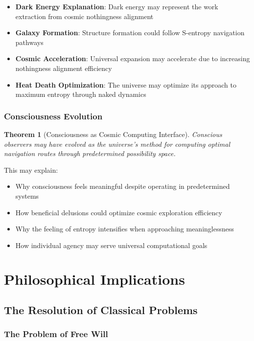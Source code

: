 \documentclass[11pt,a4paper]{article}
\newtheorem{theorem}{Theorem}[section]
\theoremstyle{remark}
\begin{document}
\begin{itemize}
\item \textbf{Dark Energy Explanation}: Dark energy may represent the work extraction from cosmic nothingness alignment
\item \textbf{Galaxy Formation}: Structure formation could follow S-entropy navigation pathways
\item \textbf{Cosmic Acceleration}: Universal expansion may accelerate due to increasing nothingness alignment efficiency
\item \textbf{Heat Death Optimization}: The universe may optimize its approach to maximum entropy through naked dynamics
\end{itemize}

\subsubsection{Consciousness Evolution}

\begin{theorem}[Consciousness as Cosmic Computing Interface]
Conscious observers may have evolved as the universe's method for computing optimal navigation routes through predetermined possibility space.
\end{theorem}

This may explain:
\begin{itemize}
\item Why consciousness feels meaningful despite operating in predetermined systems
\item How beneficial delusions could optimize cosmic exploration efficiency  
\item Why the feeling of entropy intensifies when approaching meaninglessness
\item How individual agency may serve universal computational goals
\end{itemize}

\section{Philosophical Implications}

\subsection{The Resolution of Classical Problems}

\subsubsection{The Problem of Free Will}
\end{document}
